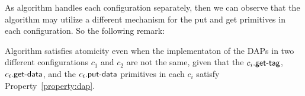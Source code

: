 As algorithm \ares{} handles each configuration separately, then we can observe that the algorithm
may utilize a different mechanism for the put and get primitives in each configuration. So the 
following remark:

\begin{remark}
	Algorithm \ares{} satisfies atomicity even when the implementaton of the  DAPs in two 
	different configurations $c_1$ and $c_2$ are not the same, given that the $c_i.\act{get-tag}$,
	$c_i.\act{get-data}$, and the $c_i.\act{put-data}$ primitives 
	in each $c_i$ satisfy Property~\ref{property:dap}.  
\end{remark}
